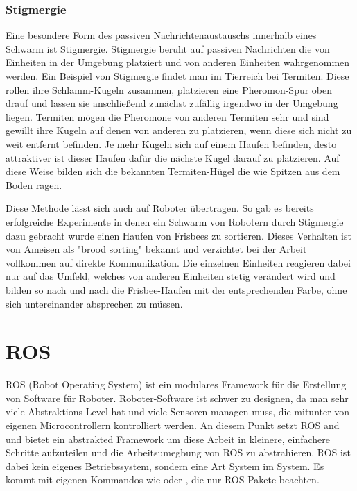 \subsubsection*{Stigmergie}\label{subsubsec:Stigmergie}

Eine besondere Form des passiven Nachrichtenaustauschs innerhalb eines Schwarm ist Stigmergie.
Stigmergie beruht auf passiven Nachrichten die von Einheiten in der Umgebung platziert und von anderen Einheiten wahrgenommen werden.
Ein Beispiel von Stigmergie findet man im Tierreich bei Termiten.
Diese rollen ihre Schlamm-Kugeln zusammen, platzieren eine Pheromon-Spur oben drauf und lassen sie anschließend zunächst zufällig irgendwo in der Umgebung liegen.
Termiten mögen die Pheromone von anderen Termiten sehr und sind gewillt ihre Kugeln auf denen von anderen zu platzieren, wenn diese sich nicht zu weit entfernt befinden.
Je mehr Kugeln sich auf einem Haufen befinden, desto attraktiver ist dieser Haufen dafür die nächste Kugel darauf zu platzieren.
Auf diese Weise bilden sich die bekannten Termiten-Hügel die wie Spitzen aus dem Boden ragen.

Diese Methode lässt sich auch auf Roboter übertragen.
So gab es bereits erfolgreiche Experimente in denen ein Schwarm von Robotern durch Stigmergie dazu gebracht wurde einen Haufen von Frisbees zu sortieren.
Dieses Verhalten ist von Ameisen als "brood sorting" bekannt und verzichtet bei der Arbeit vollkommen auf direkte Kommunikation.
Die einzelnen Einheiten reagieren dabei nur auf das Umfeld, welches von anderen Einheiten stetig verändert wird und bilden so nach und nach die Frisbee-Haufen mit der entsprechenden Farbe, ohne sich untereinander absprechen zu müssen.

\section{ROS}

ROS (Robot Operating System) ist ein modulares Framework für die Erstellung von Software für Roboter. Roboter-Software ist schwer zu designen, da man sehr viele Abstraktions-Level hat und viele Sensoren managen muss, die mitunter von eigenen Microcontrollern kontrolliert werden. An diesem Punkt setzt ROS and und bietet ein abstrakted Framework um diese Arbeit in kleinere, einfachere Schritte aufzuteilen und die Arbeitsumegbung von ROS zu abstrahieren. ROS ist dabei kein eigenes Betriebssystem, sondern eine Art System im System. Es kommt mit eigenen Kommandos wie  oder , die nur ROS-Pakete beachten.


